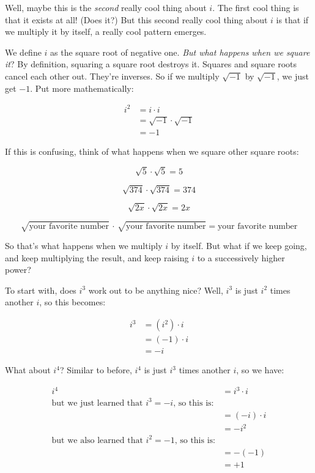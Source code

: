 \documentclass[
]{article}
\begin{document}
Well, maybe this is the \emph{second} really cool thing about \(i\). The
first cool thing is that it exists at all! (Does it?) But this second
really cool thing about \(i\) is that if we multiply it by itself, a
really cool pattern emerges.

We define \(i\) as the square root of negative one. \emph{But what
happens when we square it}? By definition, squaring a square root
destroys it. Squares and square roots cancel each other out. They're
inverses. So if we multiply \(\sqrt{-1}\) by \(\sqrt{-1}\), we just get
\(-1\). Put more mathematically:

\[
\begin{align*}
i^2 &= i\cdot i \\
&= \sqrt{-1}\cdot \sqrt{-1} \\
&= -1\end{align*}
\]

If this is confusing, think of what happens when we square other square
roots:

\[ \sqrt{5}\cdot\sqrt{5} = 5 \]

\[ \sqrt{374}\cdot\sqrt{374} = 374 \]

\[ \sqrt{2x}\cdot\sqrt{2x} = 2x \]

\[\sqrt{\text{your favorite number}}\,\cdot\,\sqrt{\text{your favorite number}} = \text{your favorite number} \]

So that's what happens when we multiply \(i\) by itself. But what if we
keep going, and keep multiplying the result, and keep raising \(i\) to a
successively higher power?

To start with, does \(i^3\) work out to be anything nice? Well, \(i^3\)
is just \(i^2\) times another \(i\), so this becomes:

\[ 
\begin{align*}
i^3 &= \left(i^2\right)\cdot i \\
&= (-1)\cdot i \\
&= -i
\end{align*}
 \]

What about \(i^4\)? Similar to before, \(i^4\) is just \(i^3\) times
another \(i\), so we have:

\[ 
\begin{align*}
i^4 &= i^3 \cdot i\\
\text{but we just learned that }i^3=-i\text{, so this is:}\\
&= (-i)\cdot i \\
&= -i^2 \\
\text{but we also learned that }i^2=-1\text{, so this is:}\\
&= -(-1)\\
&= +1
\end{align*}
 \]
\end{document}

